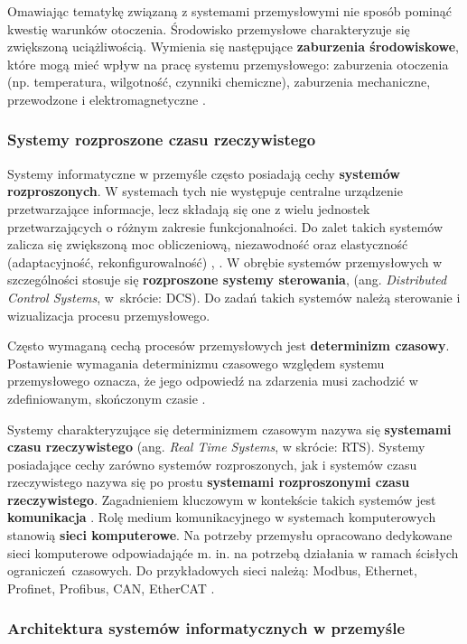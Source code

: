 \documentclass[a4paper, 12pt, twoside]{article}
\begin{document}
Omawiając tematykę związaną z systemami przemysłowymi nie sposób pominąć kwestię
warunków otoczenia. Środowisko przemysłowe charakteryzuje się zwiększoną uciążliwością.
Wymienia się następujące \textbf{zaburzenia środowiskowe}, które mogą mieć wpływ na pracę
systemu przemysłowego: zaburzenia otoczenia (np. temperatura, wilgotność, czynniki chemiczne),
zaburzenia mechaniczne, przewodzone i elektromagnetyczne \cite{isp}.

\subsubsection{Systemy rozproszone czasu rzeczywistego}

Systemy informatyczne w przemyśle często posiadają cechy \textbf{systemów rozproszonych}.
W systemach tych nie występuje centralne urządzenie
przetwarzające informacje, lecz składają się one z wielu jednostek
przetwarzających o różnym zakresie funkcjonalności. Do zalet
takich systemów zalicza się zwiększoną moc obliczeniową, niezawodność oraz
elastyczność (adaptacyjność, rekonfigurowalność)
\cite{isp},
\cite{isp-analiza-przepływu-informacji}. W obrębie systemów przemysłowych
w szczególności stosuje się \textbf{rozproszone systemy sterowania},
(ang. \emph{Distributed Control Systems}, w~skrócie: DCS). Do zadań takich systemów
należą sterowanie i wizualizacja procesu przemysłowego.

Często wymaganą cechą procesów przemysłowych jest \textbf{determinizm czasowy}.
Postawienie wymagania determinizmu czasowego względem systemu przemysłowego oznacza,
że jego odpowiedź na zdarzenia musi zachodzić w zdefiniowanym, skończonym czasie
\cite{isp}.

Systemy charakteryzujące się determinizmem czasowym nazywa się
\textbf{systemami czasu rzeczywistego} (ang. \emph{Real Time Systems}, w skrócie: RTS).
Systemy posiadające cechy zarówno systemów rozproszonych, jak i systemów
czasu rzeczywistego nazywa się po prostu \textbf{systemami rozproszonymi czasu rzeczywistego}.
Zagadnieniem kluczowym w kontekście takich systemów
jest \textbf{komunikacja} \cite{isp-analiza-przepływu-informacji}.
Rolę medium komunikacyjnego
w systemach komputerowych stanowią \textbf{sieci komputerowe}. Na potrzeby
przemysłu opracowano dedykowane sieci komputerowe odpowiadająće m. in. na potrzebą
działania w ramach ścisłych ograniczeń czasowych. Do przykładowych sieci należą:
Modbus, Ethernet, Profinet, Profibus, CAN, EtherCAT \cite{systemy-automatyki-przemyslowej}.

\subsubsection{Architektura systemów informatycznych w przemyśle}
\end{document}
